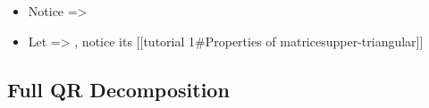 \begin{itemize}
  \begin{itemize}
  
  \item
    Notice =\textgreater{}
  \item
    Let
    =\textgreater{}
    ,
    notice its {[}{[}tutorial 1\#Properties of
    matrices\textbar upper-triangular{]}{]}
  \end{itemize}
\end{itemize}

\subsection*{Full QR Decomposition}

